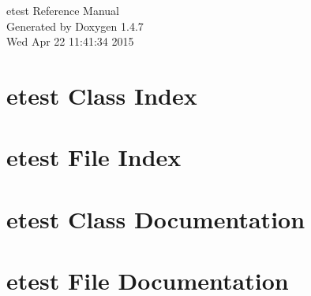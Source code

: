 \documentclass[a4paper]{book}
\begin{document}
\begin{titlepage}
\vspace*{7cm}
\begin{center}
{\Large etest Reference Manual}\\
\vspace*{1cm}
{\large Generated by Doxygen 1.4.7}\\
\vspace*{0.5cm}
{\small Wed Apr 22 11:41:34 2015}\\
\end{center}
\end{titlepage}
\clearemptydoublepage
{}
\tableofcontents
\clearemptydoublepage
{}
\chapter{etest Class Index}

\chapter{etest File Index}

\chapter{etest Class Documentation}


\chapter{etest File Documentation}












\printindex
\end{document}
